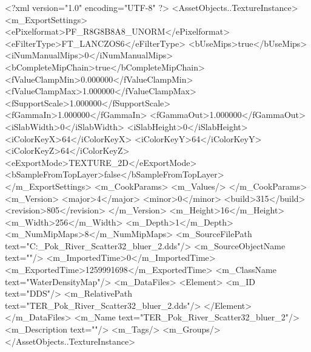 <?xml version="1.0" encoding="UTF-8" ?>
<AssetObjects..TextureInstance>
	<m_ExportSettings>
		<ePixelformat>PF_R8G8B8A8_UNORM</ePixelformat>
		<eFilterType>FT_LANCZOS6</eFilterType>
		<bUseMips>true</bUseMips>
		<iNumManualMips>0</iNumManualMips>
		<bCompleteMipChain>true</bCompleteMipChain>
		<fValueClampMin>0.000000</fValueClampMin>
		<fValueClampMax>1.000000</fValueClampMax>
		<fSupportScale>1.000000</fSupportScale>
		<fGammaIn>1.000000</fGammaIn>
		<fGammaOut>1.000000</fGammaOut>
		<iSlabWidth>0</iSlabWidth>
		<iSlabHeight>0</iSlabHeight>
		<iColorKeyX>64</iColorKeyX>
		<iColorKeyY>64</iColorKeyY>
		<iColorKeyZ>64</iColorKeyZ>
		<eExportMode>TEXTURE_2D</eExportMode>
		<bSampleFromTopLayer>false</bSampleFromTopLayer>
	</m_ExportSettings>
	<m_CookParams>
		<m_Values/>
	</m_CookParams>
	<m_Version>
		<major>4</major>
		<minor>0</minor>
		<build>315</build>
		<revision>805</revision>
	</m_Version>
	<m_Height>16</m_Height>
	<m_Width>256</m_Width>
	<m_Depth>1</m_Depth>
	<m_NumMipMaps>8</m_NumMipMaps>
	<m_SourceFilePath text="C:\Users\ilovewubbabzy\Desktop\TER_Pok_River_Scatter32_bluer_2.dds"/>
	<m_SourceObjectName text=""/>
	<m_ImportedTime>0</m_ImportedTime>
	<m_ExportedTime>1259991698</m_ExportedTime>
	<m_ClassName text="WaterDensityMap"/>
	<m_DataFiles>
		<Element>
			<m_ID text="DDS"/>
			<m_RelativePath text="TER_Pok_River_Scatter32_bluer_2.dds"/>
		</Element>
	</m_DataFiles>
	<m_Name text="TER_Pok_River_Scatter32_bluer_2"/>
	<m_Description text=""/>
	<m_Tags/>
	<m_Groups/>
</AssetObjects..TextureInstance>


